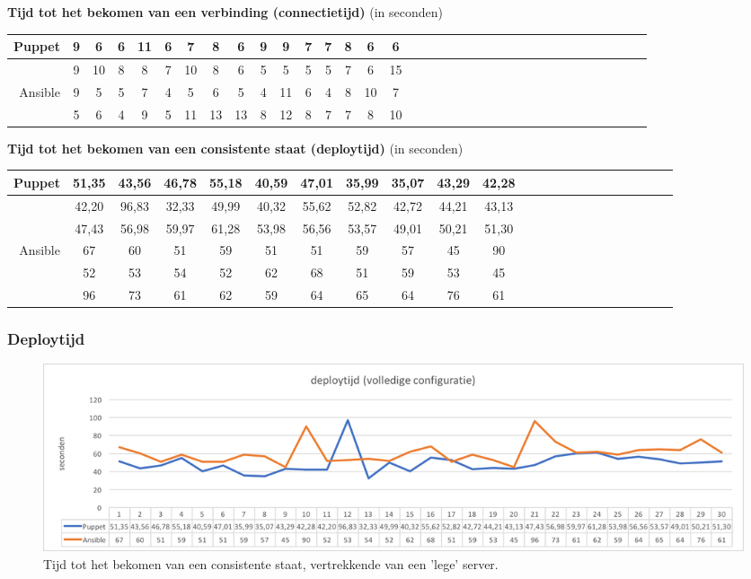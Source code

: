 \textbf{Tijd tot het bekomen van een verbinding (connectietijd)} (in seconden) \newline
\begin{tabular}{| r |c |c |c |c |c |c |c |c |c |c |c |c |c |c |c |c |c |c |c |c |c |c |c |c |c |c |c |c |c |c |c |c |c |c |}
  \hline	  		
Puppet & 9 & 6 & 6 & 11 & 6 & 7 & 8 & 6 & 9 & 9 & 7 & 7 & 8 & 6 & 6   \\ 
\hline
& 9 & 10 & 8 & 8 & 7 & 10 & 8 & 6 & 5 & 5 & 5 & 5 & 7 & 6 & 15\\
   \hline    \hline
  Ansible & 9 & 5 & 5 & 7 & 4 & 5 & 6 & 5 & 4 & 11 & 6 & 4 & 8 & 10 & 7 \\ 
\hline
   & 5 & 6 & 4 & 9 & 5 & 11 & 13 & 13 & 8 & 12 & 8 &	7 & 7 & 8  & 10 \\
  \hline  
\end{tabular}


\textbf{Tijd tot het bekomen van een consistente staat (deploytijd)} (in seconden)

\begin{tabular}{| r |c |c |c |c |c |c |c |c |c |c |c |c |c |c |c |c |c |c |c |c | c c |}
  \hline			
  
Puppet & 51,35 & 43,56 & 46,78 & 55,18 & 40,59 & 47,01 & 35,99 & 35,07 & 43,29 & 42,28  \\ \hline
           & 42,20 & 96,83 & 32,33 & 49,99 & 40,32 & 55,62 & 52,82 & 42,72 & 44,21 & 43,13 \\ \hline
            & 47,43 & 56,98	& 59,97 & 61,28 & 53,98	& 56,56 & 53,57 & 49,01 & 50,21 & 51,30 \\ \hline
              \hline 
   
  Ansible & 67 & 60 & 51 & 59 & 51 & 51 & 59 & 57 & 45 & 90 \\ \hline
                & 52  & 53 & 54 & 52 & 62 & 68 & 51 & 59 & 53 & 45  \\ \hline
                & 96 & 73 & 61 & 62	& 59 & 64	& 65 & 64 & 76 & 61  \\ \hline
                
  \hline  
\end{tabular}


\subsubsection{Deploytijd}
\begin{figure}
  \includegraphics[width=\linewidth]{img/deploytime_fullconfig.png} 
  \caption{Tijd tot het bekomen van een consistente staat, vertrekkende van een 'lege' server.}  
  \label{fig:deploytime_fullconfig}
\end{figure}

